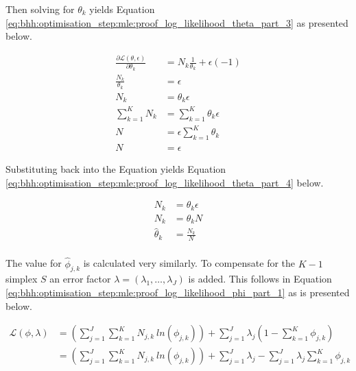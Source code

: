 Then solving for $\theta_{k}$ yields Equation \ref{eq:bhh:optimisation_step:mle:proof_log_likelihood_theta_part_3} as presented below.

\begin{equation}
      \label{eq:bhh:optimisation_step:mle:proof_log_likelihood_theta_part_3}
      \begin{split}
            \frac{\partial \mathcal{L}(\theta, \epsilon)}{\partial \theta_{k}} &=  N_{k} \frac{1}{\theta_{k}}  + \epsilon(-1) \\
            \frac{N_{k}}{\theta_{k}} &= \epsilon \\
            N_{k} &= \theta_{k} \epsilon \\
            \sum_{k=1}^{K} N_{k} &= \sum_{k=1}^{K} \theta_{k} \epsilon \\
            N &= \epsilon \sum_{k=1}^{K} \theta_{k} \\
            N &= \epsilon
      \end{split}
\end{equation}

Substituting back into the Equation yields Equation \ref{eq:bhh:optimisation_step:mle:proof_log_likelihood_theta_part_4} below.

\begin{equation}
      \label{eq:bhh:optimisation_step:mle:proof_log_likelihood_theta_part_4}
      \begin{split}
            N_{k} &= \theta_{k} \epsilon \\
            N_{k} &= \theta_{k} N \\
            \hat{\theta}_{k} &= \frac{N_{k}}{N}\\
      \end{split}
\end{equation}

The value for $\hat{\phi}_{j, k} $ is calculated very similarly. To compensate for the $K-1$ simplex $S$ an error factor $\lambda = (\lambda_{1}, \dots, \lambda_{J})$ is added. This follows in Equation \ref{eq:bhh:optimisation_step:mle:proof_log_likelihood_phi_part_1} as is presented below.

\begin{equation}
      \label{eq:bhh:optimisation_step:mle:proof_log_likelihood_phi_part_1}
      \begin{split}
            \mathcal{L}(\phi, \lambda)
            &=  \left( \sum_{j=1}^{J} \sum_{k=1}^{K} N_{j,k} \ ln \left( \phi_{j,k} \right) \right) + \sum_{j=1}^{J} \lambda_{j} \left( 1 - \sum_{k=1}^{K} \phi_{j,k} \right) \\
            &=  \left( \sum_{j=1}^{J} \sum_{k=1}^{K} N_{j,k} \ ln \left( \phi_{j,k} \right) \right) + \sum_{j=1}^{J} \lambda_{j} - \sum_{j=1}^{J} \lambda_{j} \sum_{k=1}^{K} \phi_{j,k} \\
      \end{split}
\end{equation}

